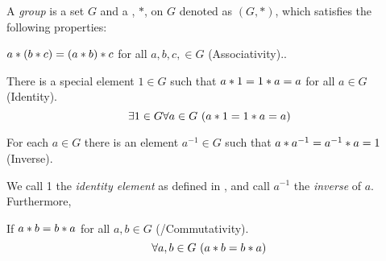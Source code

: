 \begin{definition}[Group]\label{def:Group}
  A \emph{group} is a set $G$ and a , $*$, on $G$ denoted as $(G, *)$, which satisfies the following properties:
  \begin{propertylist}
  \item $a * (b * c) = (a * b) * c$ for all $a, b, c, \in G$ (Associativity).\label{prop:Group_Properties-Associativity}.
  \item There is a special element $1 \in G$ such that $a * 1 = 1 * a = a$ for all $a \in G$ (Identity).\label{prop:Group_Properties-Identity}
    \begin{equation*}
      \exists 1 \in G \forall a \in G \, \left( a * 1 = 1 * a = a \right)
    \end{equation*}

  \item For each $a \in G$ there is an element $a^{-1} \in G$ such that $a * a^{-1} = a^{-1} * a = 1$  (Inverse).\label{prop:Group_Properties-Inverse}
  \end{propertylist}
  
  We call 1 the \emph{identity element} as defined in , and call $a^{-1}$ the \emph{inverse} of $a$.
  Furthermore,
  \begin{propertylist}[resume]
  \item If $a * b = b * a$ for all $a,b \in G$ (/Commutativity).\label{prop:Group_Properties-Commutativity}
    \begin{equation*}
      \forall a,b \in G \, \left( a * b = b * a \right)
    \end{equation*}
  \end{propertylist}
\end{definition}

